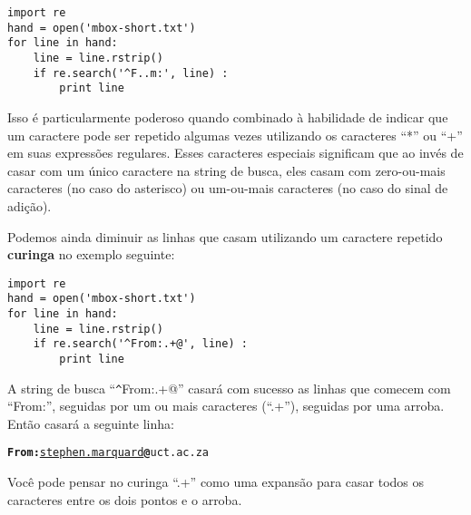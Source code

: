 \beforeverb
\begin{verbatim}
import re
hand = open('mbox-short.txt')
for line in hand:
    line = line.rstrip()
    if re.search('^F..m:', line) :
        print line
\end{verbatim}
\afterverb
%

Isso é particularmente poderoso quando combinado à habilidade de indicar que um caractere pode
ser repetido algumas vezes utilizando os caracteres ``*'' ou ``+'' em suas expressões regulares.
Esses caracteres especiais significam que ao invés de casar com um único caractere na string de
busca, eles casam com zero-ou-mais caracteres (no caso do asterisco) ou um-ou-mais caracteres 
(no caso do sinal de adição).

Podemos ainda diminuir as linhas que casam utilizando um caractere repetido {\bf curinga} no 
exemplo seguinte: 

\beforeverb
\begin{verbatim}
import re
hand = open('mbox-short.txt')
for line in hand:
    line = line.rstrip()
    if re.search('^From:.+@', line) :
        print line
\end{verbatim}
\afterverb
%

A string de busca ``\verb"^"From:.+@'' casará com sucesso as linhas que comecem com ``From:'',
seguidas por um ou mais caracteres (``.+''), seguidas por uma arroba. Então casará a seguinte
linha:

\beforeverb
\begin{alltt}
{\bf From:}\underline{ stephen.marquard}{\bf @}uct.ac.za
\end{alltt}
\afterverb

Você pode pensar no curinga ``.+'' como uma expansão para casar todos os caracteres entre os 
dois pontos e o arroba. 

